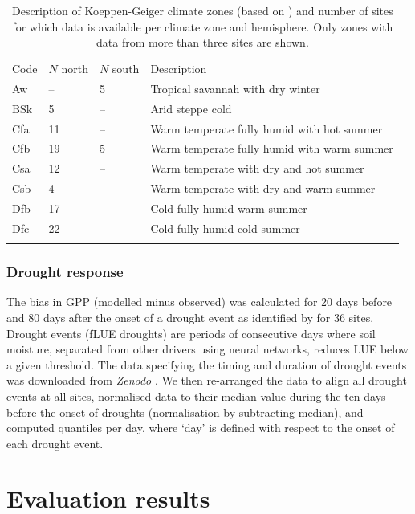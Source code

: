 \documentclass[gmd, manuscript]{copernicus}
\begin{document}
\begin{table}[t]
\caption{Description of Koeppen-Geiger climate zones (based on \citet{falge17}) and number of sites for which data is available per climate zone and hemisphere. Only zones with data from more than three sites are shown.}
\begin{tabular}{llll}
\tophline
  Code & $N$ north & $N$ south & Description \\ 
\middlehline
  Aw   & -- & 5 &  Tropical savannah with dry winter \\ 
  BSk  & 5 & -- & Arid steppe cold \\ 
  Cfa  & 11 & -- & Warm temperate fully humid with hot summer \\ 
  Cfb  & 19 & 5 & Warm temperate fully humid with warm summer \\ 
  Csa  & 12 & -- & Warm temperate with dry and hot summer \\ 
  Csb  & 4 & -- & Warm temperate with dry and warm summer \\ 
  Dfb  & 17 & -- & Cold fully humid warm summer \\ 
  Dfc  & 22 & -- & Cold fully humid cold summer \\ 
\bottomhline
\end{tabular}
\belowtable{} %
  \label{tab:kgclimate}
\end{table}


\subsubsection{Drought response}
\label{sec:droughtresponse}
The bias in GPP (modelled minus observed) was calculated for 20 days before and 80 days after the onset of a drought event as identified by \citet{stocker18newphyt} for 36 sites. Drought events (fLUE droughts) are periods of consecutive days where soil moisture, separated from other drivers using neural networks, reduces LUE below a given threshold. The data specifying the timing and duration of drought events was downloaded from \textit{Zenodo} \citep{flue}. We then re-arranged the data to align all drought events at all sites, normalised data to their median value during the ten days before the onset of droughts (normalisation by subtracting median), and computed quantiles per day, where `day' is defined with respect to the onset of each drought event.


\section{Evaluation results}
\label{sec:results}
\end{document}
